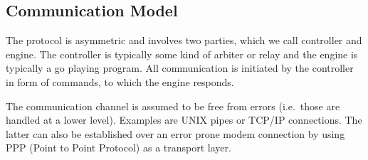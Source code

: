 \documentclass[a4paper]{article}
\begin{document}
\subsection{Communication Model}
\label{sec:communication-model}
The protocol is asymmetric and involves two parties, which we call
controller and engine. The controller is typically some kind of
arbiter or relay and the engine is typically a go playing program. All
communication is initiated by the controller in form of commands, to
which the engine responds.

The communication channel is assumed to be free from errors (i.e.\ 
those are handled at a lower level). Examples are UNIX pipes or TCP/IP
connections. The latter can also be established over an error prone
modem connection by using PPP (Point to Point Protocol) as a transport
layer.
\end{document}
